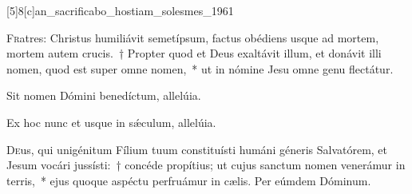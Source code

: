 \documentclass[vesperale_romanum.tex]{subfiles}
\begin{document}



[5]{8}[c]{an_sacrificabo_hostiam_solesmes_1961}




\lettrine{F}{r}atres: Christus humiliávit semetípsum, factus obédiens usque ad mortem, mortem autem crucis.~† Propter quod et Deus exaltávit illum, et donávit illi nomen, quod est super omne nomen,~* ut in nómine Jesu omne genu flectátur.

\hymnus


\vv Sit nomen Dómini benedíctum, allelúia.

\rr Ex hoc nunc et usque in sǽculum, allelúia.


\oratio

\lettrine{D}{e}us, qui unigénitum Fílium tuum constituísti humáni géneris Salvatórem, et Jesum vocári jussísti:~† concéde propítius; ut cujus san\-ctum nomen venerámur in terris,~* ejus quoque aspéctu perfruámur in cælis. Per eúmdem Dóminum.



\omniapraeter




\simplex

%
%
\end{document}
